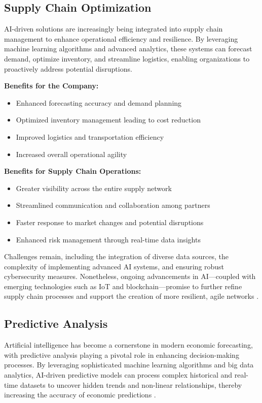 \subsection{Supply Chain Optimization}

AI-driven solutions are increasingly being integrated into supply chain management to enhance operational efficiency and resilience. By leveraging machine learning algorithms and advanced analytics, these systems can forecast demand, optimize inventory, and streamline logistics, enabling organizations to proactively address potential disruptions.

\textbf{Benefits for the Company:}
\begin{itemize}
    \item Enhanced forecasting accuracy and demand planning
    \item Optimized inventory management leading to cost reduction
    \item Improved logistics and transportation efficiency
    \item Increased overall operational agility
\end{itemize}

\textbf{Benefits for Supply Chain Operations:}
\begin{itemize}
    \item Greater visibility across the entire supply network
    \item Streamlined communication and collaboration among partners
    \item Faster response to market changes and potential disruptions
    \item Enhanced risk management through real-time data insights
\end{itemize}

Challenges remain, including the integration of diverse data sources, 
the complexity of implementing advanced AI systems, and ensuring robust cybersecurity measures. Nonetheless, ongoing advancements 
in AI—coupled with emerging technologies such as IoT and blockchain—promise to further refine supply chain processes and support the creation of more resilient, 
agile networks \cite{IBM-AI-Supply-Chain}.

\subsection{Predictive Analysis}

Artificial intelligence has become a cornerstone in modern economic forecasting, with predictive analysis playing a pivotal role in enhancing decision-making processes. By leveraging sophisticated machine learning algorithms and big data analytics, AI-driven predictive models can process complex historical and real-time datasets to uncover hidden trends and non-linear relationships, thereby increasing the accuracy of economic predictions \cite{Predictive-Analysis-ai}.

